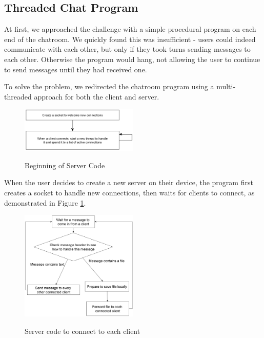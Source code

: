 \documentclass{article}
\begin{document}

\subsection{Threaded Chat Program}

At first, we approached the challenge with a simple procedural program on each end of the chatroom. We quickly found this was insufficient - users could indeed communicate with each other, but only if they took turns sending messages to each other. Otherwise the program would hang, not allowing the user to continue to send messages until they had received one.

To solve the problem, we redirected the chatroom program using a multi-threaded approach for both the client and server.

\begin{figure}[h]
\caption{Beginning of Server Code}
\centering
\includegraphics[width=0.5\textwidth]{media/serverFlowchart2.png}
\label{server2}
\end{figure}

When the user decides to create a new server on their device, the program first creates a socket to handle new connections, then waits for clients to connect, as demonstrated in Figure \ref{server2}.

\begin{figure}[h]
\caption{Server code to connect to each client}
\centering
\includegraphics[width=0.5\textwidth]{media/serverFlowchart1.png}
\label{server1}
\end{figure}
\end{document}
